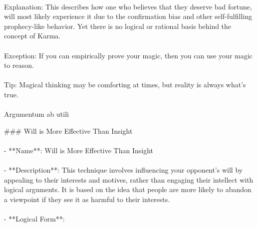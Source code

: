 \documentclass[a4paper,12pt,single,pdftex]{scrartcl}
\begin{document}
    
      
    \\

    
      Explanation: This describes how one who believes that they deserve bad fortune, will most likely experience it due to the confirmation bias and other self-fulfilling prophecy-like behavior.  Yet there is no logical or rational basis behind the concept of Karma.
    \\

    
      
    \\

    
      Exception: If you can empirically prove your magic, then you can use your magic to reason.
    \\

    
      
    \\

    
      Tip: Magical thinking may be comforting at times, but reality is always what’s true.
    \\

    
      
    \\

  

Argumentum ab utili
    
      \#\#\# Will is More Effective Than Insight
    \\

    
      
    \\

    
      - **Name**: Will is More Effective Than Insight
    \\

    
      
    \\

    
      - **Description**: This technique involves influencing your opponent's will by appealing to their interests and motives, rather than engaging their intellect with logical arguments. It is based on the idea that people are more likely to abandon a viewpoint if they see it as harmful to their interests.
    \\

    
      
    \\

    
      - **Logical Form**:
    \\
\end{document}
